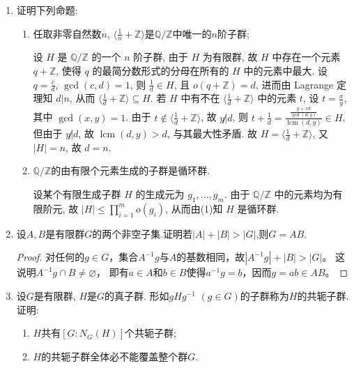 \begin{enumerate}
\item 证明下列命题:
\begin{enumerate}[label=(\arabic*)]
\item 任取非零自然数$n$, $\big\langle \frac{1}{n} + \mathbb{Z}\big\rangle$是$\mathbb{Q}/\mathbb{Z}$中唯一的$n$阶子群;
\begin{solution}
    设 $H$ 是 $\mathbb{Q}/\mathbb{Z}$ 的一个 $n$ 阶子群,
    由于 $H$ 为有限群,
    故 $H$ 中存在一个元素 $q+\mathbb{Z}$,
    使得 $q$ 的最简分数形式的分母在所有的 $H$ 中的元素中最大.
    设 $q=\frac{c}{d}$, $\gcd(c,d)=1$,
    则 $\frac{1}{d}\in H$, 且 $o\left(q+\mathbb{Z}\right)=d$,
    进而由 Lagrange 定理知 $d|n$,
    从而 $\big\langle\frac{1}{d}+\mathbb{Z}\big\rangle \subseteq H$.
    若 $H$ 中有不在 $\big\langle\frac{1}{d}+\mathbb{Z}\big\rangle$ 中的元素 $t$,
    设 $t=\frac{x}{y}$, 其中 $\gcd(x,y)=1$.
    由于 $t\notin \big\langle\frac{1}{d}+\mathbb{Z}\big\rangle$,
    故 $y\not| d$,
    则 $t+\frac{1}{d}=\frac{\frac{y+xd}{\gcd(d,y)}}{\operatorname{lcm}(d,y)} \in H$,
    但由于 $y\not| d$,
    故 $\operatorname{lcm}(d,y) > d$,
    与其最大性矛盾.
    故 $H=\big\langle\frac{1}{d}+\mathbb{Z}\big\rangle$,
    又 $|H|=n$, 故 $d=n$. 
\end{solution}
\item $\mathbb{Q}/\mathbb{Z}$的由有限个元素生成的子群是循环群.
\begin{solution}
    设某个有限生成子群 $H$ 的生成元为 $g_1,\dots,g_m$.
    由于 $\mathbb{Q}/\mathbb{Z}$ 中的元素均为有限阶元,
    故 $\left|H\right| \leqslant \prod\limits_{i=1}^m o(g_i)$,
    从而由(1)知 $H$ 是循环群. 
\end{solution}

\end{enumerate}

\item 设$A,B$是有限群$G$的两个非空子集.证明若$|A|+|B|>|G|$,则$G = AB$.
\begin{proof}
    对任何的$g \in G$，集合$A^{-1}g$与$A$的基数相同，故$|A^{-1}g|+|B|>|G|$。
    这说明$A^{-1}g \cap B\ne\varnothing$，
    即有$a \in A$和$b \in B$使得$a^{-1}g=b$，因而$g=ab \in AB$。
\end{proof}
\item 设$G$是有限群, $H$是$G$的真子群. 形如$gHg^{-1}$ $(g \in G)$的子群称为$H$的共轭子群.证明:
\begin{enumerate}[label=(\arabic*)]
\item $H$共有$\left[G: N_{G}(H)\right]$个共轭子群;

\item $H$的共轭子群全体必不能覆盖整个群$G$.


\end{enumerate}
\end{enumerate}
